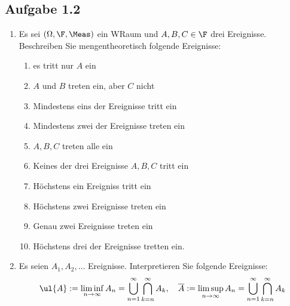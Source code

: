 \subsection{Aufgabe 1.2}
\begin{enumerate}
	\item Es sei $(\Omega, \F, \Meas)$ ein WRaum und $A,B,C \in \F$ drei Ereignisse. Beschreiben Sie mengentheoretisch folgende Ereignisse:
	\begin{enumerate}
		\item es tritt nur $A$ ein
		\item $A$ und $B$ treten ein, aber $C$ nicht
		\item Mindestens eins der Ereignisse tritt ein
		\item Mindestens zwei der Ereignisse treten ein
		\item $A,B,C$ treten alle ein
		\item Keines der drei Ereignisse $A,B,C$ tritt ein
		\item Höchstens ein Ereigniss tritt ein
		\item Höchstens zwei Ereignisse treten ein
		\item Genau zwei Ereignisse treten ein
		\item Höchstens drei der Ereignisse tretten ein.
	\end{enumerate}
	\item Es seien $A_1,A_2, \dots$ Ereignisse. Interpretieren Sie folgende Ereignisse:
		\begin{align*}
			\ul{A}:= \liminf_{n \to \infty} A_n = \bigcup_{n=1}^{\infty}\bigcap_{k=n}^{\infty} A_k, \quad \overline{A}:= \limsup_{n \to \infty} A_n = \bigcup_{n=1}^{\infty}\bigcap_{k=n}^{\infty} A_k
		\end{align*}
\end{enumerate}


